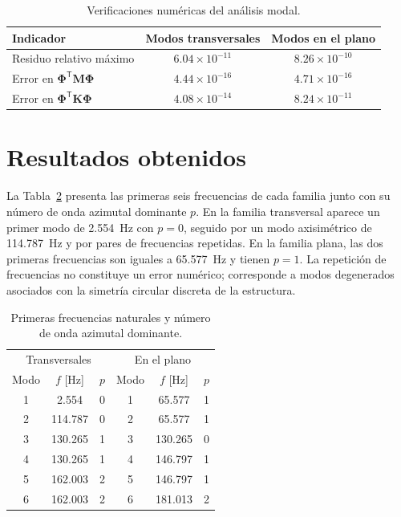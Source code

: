 \documentclass[11pt,letterpaper]{article}
\begin{document}
\begin{table}[H]
\centering
\small
\caption{Verificaciones numéricas del análisis modal.}
\label{tab:verificacion}
\begin{tabular}{@{}lcc@{}}
\toprule
Indicador & Modos transversales & Modos en el plano \\
\midrule
Residuo relativo máximo & $6.04\times10^{-11}$ & $8.26\times10^{-10}$ \\
Error en $\boldsymbol{\Phi}^{\mathsf T}\mathbf M\boldsymbol{\Phi}$ & $4.44\times10^{-16}$ & $4.71\times10^{-16}$ \\
Error en $\boldsymbol{\Phi}^{\mathsf T}\mathbf K\boldsymbol{\Phi}$ & $4.08\times10^{-14}$ & $8.24\times10^{-11}$ \\
\bottomrule
\end{tabular}
\end{table}

\section{Resultados obtenidos}

La Tabla~\ref{tab:frecuencias} presenta las primeras seis frecuencias de cada familia junto con su número de onda azimutal dominante $p$. En la familia transversal aparece un primer modo de 2.554~Hz con $p=0$, seguido por un modo axisimétrico de 114.787~Hz y por pares de frecuencias repetidas. En la familia plana, las dos primeras frecuencias son iguales a 65.577~Hz y tienen $p=1$. La repetición de frecuencias no constituye un error numérico; corresponde a modos degenerados asociados con la simetría circular discreta de la estructura.

\begin{table}[H]
\centering
\small
\caption{Primeras frecuencias naturales y número de onda azimutal dominante.}
\label{tab:frecuencias}
\begin{tabular}{@{}ccc|ccc@{}}
\toprule
\multicolumn{3}{c|}{Transversales} & \multicolumn{3}{c}{En el plano}\\
Modo & $f$ [Hz] & $p$ & Modo & $f$ [Hz] & $p$ \\
\midrule
1 & 2.554 & 0 & 1 & 65.577 & 1 \\
2 & 114.787 & 0 & 2 & 65.577 & 1 \\
3 & 130.265 & 1 & 3 & 130.265 & 0 \\
4 & 130.265 & 1 & 4 & 146.797 & 1 \\
5 & 162.003 & 2 & 5 & 146.797 & 1 \\
6 & 162.003 & 2 & 6 & 181.013 & 2 \\
\bottomrule
\end{tabular}
\end{table}
\end{document}
